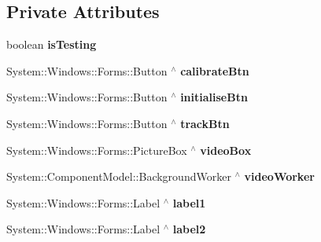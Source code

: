 \subsection*{Private Attributes}
\begin{DoxyCompactItemize}
\item 
\mbox{\label{class_gaze_track_g_u_i_1_1_g_u_i_ad5a6ff26d3176f831b888dd00be76b1b}} 
boolean {\bfseries is\+Testing}
\item 
\mbox{\label{class_gaze_track_g_u_i_1_1_g_u_i_a771b0d9730e3fed009bcf74af7505e39}} 
System\+::\+Windows\+::\+Forms\+::\+Button $^\wedge$ {\bfseries calibrate\+Btn}
\item 
\mbox{\label{class_gaze_track_g_u_i_1_1_g_u_i_a0082f0e959bb2805b5aca7d6b5b0d9f7}} 
System\+::\+Windows\+::\+Forms\+::\+Button $^\wedge$ {\bfseries initialise\+Btn}
\item 
\mbox{\label{class_gaze_track_g_u_i_1_1_g_u_i_ab510e556129819173b48b8753a33c25d}} 
System\+::\+Windows\+::\+Forms\+::\+Button $^\wedge$ {\bfseries track\+Btn}
\item 
\mbox{\label{class_gaze_track_g_u_i_1_1_g_u_i_a6ef27bf07fc275f2f5f8c566f8505907}} 
System\+::\+Windows\+::\+Forms\+::\+Picture\+Box $^\wedge$ {\bfseries video\+Box}
\item 
\mbox{\label{class_gaze_track_g_u_i_1_1_g_u_i_abd4f64e832593f8294265c2b35f98c0e}} 
System\+::\+Component\+Model\+::\+Background\+Worker $^\wedge$ {\bfseries video\+Worker}
\item 
\mbox{\label{class_gaze_track_g_u_i_1_1_g_u_i_a2475cbabc925f2d55b244b22f68ff5b9}} 
System\+::\+Windows\+::\+Forms\+::\+Label $^\wedge$ {\bfseries label1}
\item 
\mbox{\label{class_gaze_track_g_u_i_1_1_g_u_i_af703f54c4e614265b920b7d51c0d680c}} 
System\+::\+Windows\+::\+Forms\+::\+Label $^\wedge$ {\bfseries label2}
\item 
\mbox{\label{class_gaze_track_g_u_i_1_1_g_u_i_aab3cfd8ac103350a6004f9929f2be87d}} 

\end{DoxyCompactItemize}
